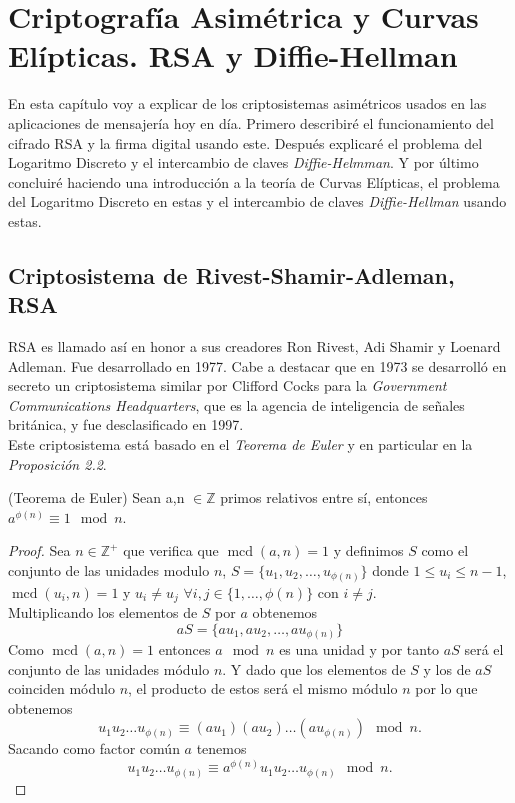 \chapter{Criptografía Asimétrica y Curvas Elípticas. RSA y Diffie-Hellman}
En esta capítulo voy a explicar de los criptosistemas asimétricos usados en las aplicaciones de mensajería hoy en día. Primero describiré el funcionamiento del cifrado RSA y la firma digital usando este. Después explicaré el problema del Logaritmo Discreto y el intercambio de claves \emph{Diffie-Helmman}. Y por último concluiré haciendo una introducción a la teoría de Curvas Elípticas, el problema del Logaritmo Discreto en estas y el intercambio de claves \emph{Diffie-Hellman} usando estas.\\

\section{Criptosistema de Rivest-Shamir-Adleman, RSA}
RSA es llamado así en honor a sus creadores Ron Rivest, Adi Shamir y Loenard Adleman. Fue desarrollado en 1977. Cabe a destacar que en 1973 se desarrolló en secreto un criptosistema similar por Clifford Cocks para la \emph{Government Communications Headquarters}, que es la agencia de inteligencia de señales británica, y fue desclasificado en 1997\cite{cliffordCocks}.\\
Este criptosistema está basado en el \emph{Teorema de Euler} y en particular en la \emph{Proposición 2.2}.\\


\begin{teorema}
	(Teorema de Euler) Sean a,n $\in \mathbb{Z}$ primos relativos entre sí, entonces $a^{\phi(n)}\equiv 1 \mod n$.
\end{teorema}\vspace*{-7mm}
\begin{proof}
		Sea $n\in \mathbb{Z^+}$ que verifica que $\operatorname{mcd}(a,n)=1$ y definimos $S$ como el conjunto de las unidades modulo $n$, $S=\{u_1,u_2,\dots,u_{\phi(n)}\}$ donde $1\leq u_i\leq n-1$, $\operatorname{mcd}(u_i,n)=1$ y $u_i\neq u_j$ $\forall i,j \in \{1,\dots,\phi(n)\}$ con $ i\neq j$.\\
	Multiplicando  los elementos de $S$ por $a$ obtenemos 
	$$
		aS=\{au_1,au_2,\dots,au_{\phi(n)}\}
	$$
	Como $\operatorname{mcd}(a,n)=1$ entonces $a\mod n$ es una unidad y por tanto $aS$ será el conjunto de las unidades módulo $n$. Y dado que los elementos de $S$ y los de $aS$ coinciden módulo $n$, el producto de estos será el mismo módulo $n$ por lo que obtenemos 
	$$
		u_1u_2\dots u_{\phi(n)} \equiv (au_1)(au_2)\dots (au_{\phi(n)})\mod n.
	$$
	Sacando como factor común $a$ tenemos 
	$$
		u_1u_2\dots u_{\phi(n)} \equiv a^{\phi(n)}u_1u_2\dots u_{\phi(n)}\mod n. 
	$$
\end{proof}\\

